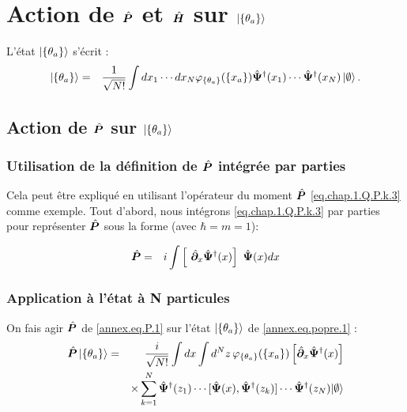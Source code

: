 \chapter{Action de $\hat{\bm{P}}$ et $\hat{\bm{H}}$ sur $\ket{\{\theta_a\}}$}
\label{annex:PH}
\minitoc

L'état $\ket{\{\theta_a\}}$ s'écrit :
\begin{eqnarray}\label{annex.eq.popre.1}
	\ket{\{ \theta_a \}} & = & \frac{1}{\sqrt{N!}} \int dx_1 \cdots dx_N \varphi_{\{ \theta_a \}} ( \{x_a\}) \hat{\bm{\Psi}}^\dagger(x_1) \cdots \hat{\bm{\Psi}}^\dagger(x_N)	 \ket{\emptyset}.
\end{eqnarray}

\section{Action de $\hat{\bm{P}}$ sur $\ket{\{\theta_a\}}$}

\subsection{Utilisation de la définition de $\hat{\bm{P}}$ intégrée par parties }

Cela peut être expliqué en utilisant l'opérateur du moment $\hat{\bm{P}}$ \eqref{eq.chap.1.Q.P.k.3} comme exemple. Tout d'abord, nous intégrons \eqref{eq.chap.1.Q.P.k.3} par parties pour représenter $\hat{\bm{P}}$ sous la forme (avec $\hbar = m =1$):

\begin{eqnarray}\label{annex.eq.P.1}
	\operator{P} & = & i \int \left [ \operator{\partial}_x \operator{\Psi}^\dag(x)\right ] \operator{\Psi}(x) dx 
\end{eqnarray}

\subsection{Application à l’état à N particules}
On fais agir $\hat{\bm{P}}$ de \eqref{annex.eq.P.1} sur l'état $\ket{\{ \theta_a \}}$ de \eqref{annex.eq.popre.1} :   
\begin{eqnarray}
	\hat{\bm{P}}\ket{\{\theta_a\}}  & = & \frac{i}{ \sqrt{N!}} \int dx \int d^N z \, \varphi_{\{ \theta_a \}} ( \{x_a\}) 	\left [\hat{\bm{\partial}}_x \hat{\bm{\Psi}}^\dag(x)\right ]  \\ & & \times \sum_{k = 1 }^N \hat{\bm{\Psi}}^\dag(z_1) \cdots [\hat{\bm{\Psi}}(x) , \hat{\bm{\Psi}}^\dag(z_k)] \cdots \hat{\bm{\Psi}}^\dag(z_N) \vert \emptyset \rangle
\end{eqnarray}

